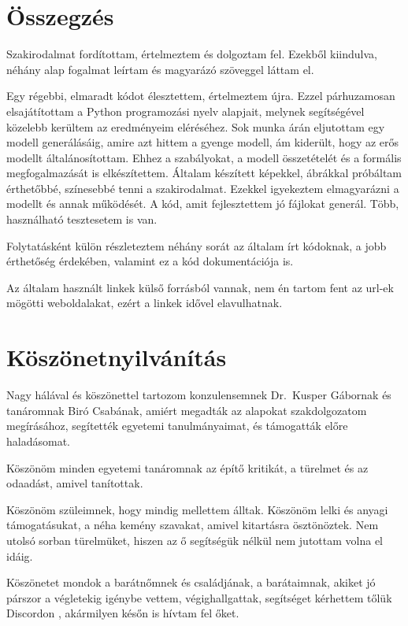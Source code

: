 \documentclass[
]{thesis-ekf}
\theoremstyle{definition}
\theoremstyle{remark}
\begin{document}
\chapter*{Összegzés}
	Szakirodalmat fordítottam, értelmeztem és dolgoztam fel.
	Ezekből kiindulva, néhány alap fogalmat leírtam és magyarázó szöveggel láttam el.


	Egy régebbi, elmaradt kódot élesztettem, értelmeztem újra.
	Ezzel párhuzamosan elsajátítottam a Python programozási nyelv alapjait, melynek segítségével közelebb kerültem az eredményeim eléréséhez.
	Sok munka árán eljutottam egy modell generálásáig, amire azt hittem a gyenge modell, ám kiderült, hogy az erős modellt általánosítottam.
	Ehhez a szabályokat, a modell összetételét és a formális megfogalmazását is elkészítettem.
	Általam készített képekkel, ábrákkal próbáltam érthetőbbé, színesebbé tenni a szakirodalmat.
	Ezekkel igyekeztem elmagyarázni a modellt és annak működését.
	A kód, amit fejlesztettem jó fájlokat generál. Több, használható tesztesetem is van.
	
	Folytatásként külön részleteztem néhány sorát az általam írt kódoknak, a jobb érthetőség érdekében, valamint ez a kód dokumentációja is.

	Az általam használt linkek külső forrásból vannak, nem én tartom fent az url-ek mögötti weboldalakat, ezért a linkek idővel elavulhatnak.
	
\chapter*{Köszönetnyilvánítás}

	Nagy hálával és köszönettel tartozom konzulensemnek Dr.~Kusper Gábornak és tanáromnak Biró Csabának, amiért megadták az alapokat szakdolgozatom megírásához, segítették egyetemi tanulmányaimat, és támogatták előre haladásomat.

	Köszönöm minden egyetemi tanáromnak az építő kritikát, a türelmet és az odaadást, amivel tanítottak.
	
	Köszönöm szüleimnek, hogy mindig mellettem álltak. Köszönöm lelki és anyagi támogatásukat, a néha kemény szavakat, amivel kitartásra ösztönöztek. Nem utolsó sorban türelmüket, hiszen az ő segítségük nélkül nem jutottam volna el idáig.
	
	Köszönetet mondok a barátnőmnek és családjának, a barátaimnak, akiket jó párszor a végletekig igénybe vettem, végighallgattak, segítséget kérhettem tőlük Discordon \cite{dc}, akármilyen későn is hívtam fel őket.
	
\end{document}
